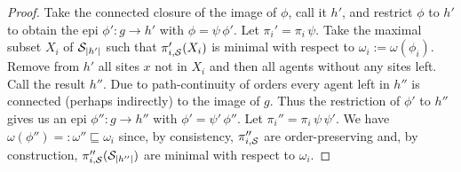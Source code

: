 \documentclass[a4paper,12pt]{article}
\newcommand{\anon}[1]{\left|#1\right|}
\begin{document}
\begin{proof}
  Take the connected closure of the image of $\phi$,
  call it $h'$, and restrict $\phi$ to $h'$ to obtain
  the epi $\phi': g \to h'$ with $\phi = \psi\,\phi'$.
  Let $\pi_i' = \pi_i\,\psi$.
  Take the maximal subset $X_i$ of $\sites_{\anon{h'}}$
  such that $\pi_{i,\mathcal{S}}'(X_i)$ is minimal
  with respect to $\omega_i := \omega(\phi_i)$.
  Remove from $h'$ all sites $x$ not in $X_i$ %
  and then all agents without any sites left.
  Call the result $h''$.
  Due to path-continuity of orders
  every agent left in $h''$ is connected
  (perhaps indirectly) to the image of $g$.
  Thus the restriction of $\phi'$ to $h''$
  gives us an epi $\phi'': g \to h''$
  with $\phi' = \psi'\,\phi''$.
  Let $\pi_i'' = \pi_i\,\psi\,\psi'$.
  We have $\omega(\phi'') =: \omega'' \sqsubseteq \omega_i$
  since, by consistency,
  $\pi_{i,\mathcal{S}}''$ are order-preserving
  and, by construction,
  $\pi_{i,\sites}''(\sites_{\anon{h''}})$ are minimal
  with respect to $\omega_i$.


\end{proof}
\end{document}
